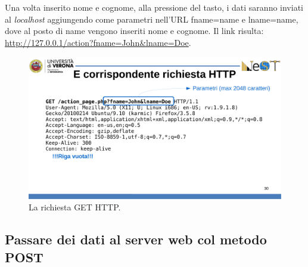 \documentclass[a4paper]{article}
\begin{document}
	\noindent
	Una volta inserito nome e cognome, alla pressione del tasto, i dati saranno inviati al \emph{localhost} aggiungendo come parametri nell'URL \textsf{fname=name} e \textsf{lname=name}, dove al posto di name vengono inseriti nome e cognome. Il link risulta: \url{http://127.0.0.1/action?fname=John&lname=Doe}.\newpage
	
	\begin{figure}[!htp]
		\centering
		\includegraphics[width=\textwidth]{img/richiesta_get.pdf}
		\caption{La richiesta GET HTTP.}
	\end{figure}\newpage

	\subsection{Passare dei dati al server web col metodo POST}
	
\end{document}
